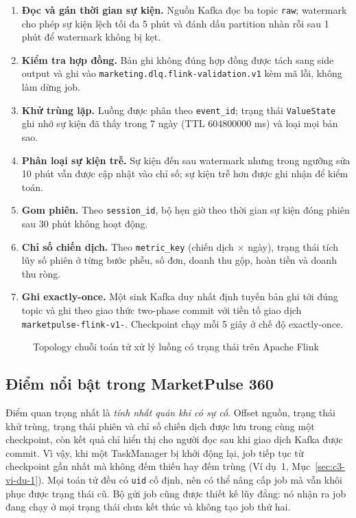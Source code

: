 \begin{enumerate}
    \item \textbf{Đọc và gán thời gian sự kiện.} Nguồn Kafka đọc ba topic \texttt{raw}; watermark cho phép sự kiện lệch tối đa 5 phút và đánh dấu partition nhàn rỗi sau 1 phút để watermark không bị kẹt.
    \item \textbf{Kiểm tra hợp đồng.} Bản ghi không đúng hợp đồng được tách sang side output và ghi vào \texttt{marketing.dlq.flink-validation.v1} kèm mã lỗi, không làm dừng job.
    \item \textbf{Khử trùng lặp.} Luồng được phân theo \texttt{event\_id}; trạng thái \texttt{ValueState} ghi nhớ sự kiện đã thấy trong 7 ngày (TTL \num{604800000} ms) và loại mọi bản sao.
    \item \textbf{Phân loại sự kiện trễ.} Sự kiện đến sau watermark nhưng trong ngưỡng sửa 10 phút vẫn được cập nhật vào chỉ số; sự kiện trễ hơn được ghi nhận để kiểm toán.
    \item \textbf{Gom phiên.} Theo \texttt{session\_id}, bộ hẹn giờ theo thời gian sự kiện đóng phiên sau 30 phút không hoạt động.
    \item \textbf{Chỉ số chiến dịch.} Theo \texttt{metric\_key} (chiến dịch $\times$ ngày), trạng thái tích lũy số phiên ở từng bước phễu, số đơn, doanh thu gộp, hoàn tiền và doanh thu ròng.
    \item \textbf{Ghi exactly-once.} Một sink Kafka duy nhất định tuyến bản ghi tới đúng topic và ghi theo giao thức two-phase commit với tiền tố giao dịch \texttt{marketpulse-flink-v1-}. Checkpoint chạy mỗi 5 giây ở chế độ exactly-once.
\end{enumerate}

\begin{figure}[H]
    \centering
    \resizebox{\textwidth}{!}{}
    \caption{Topology chuỗi toán tử xử lý luồng có trạng thái trên Apache Flink}
    \label{fig:flink}
\end{figure}

\subsection{Điểm nổi bật trong MarketPulse 360}
\label{sec:c3-flink-hien-thuc}
Điểm quan trọng nhất là \emph{tính nhất quán khi có sự cố}. Offset nguồn, trạng thái khử trùng, trạng thái phiên và chỉ số chiến dịch được lưu trong cùng một checkpoint, còn kết quả chỉ hiển thị cho người đọc sau khi giao dịch Kafka được commit. Vì vậy, khi một TaskManager bị khởi động lại, job tiếp tục từ checkpoint gần nhất mà không đếm thiếu hay đếm trùng (Ví dụ~1, Mục~\ref{sec:c3-vi-du-1}). Mọi toán tử đều có \texttt{uid} cố định, nên có thể nâng cấp job mà vẫn khôi phục được trạng thái cũ. Bộ gửi job cũng được thiết kế lũy đẳng: nó nhận ra job đang chạy ở mọi trạng thái chưa kết thúc và không tạo job thứ hai.

